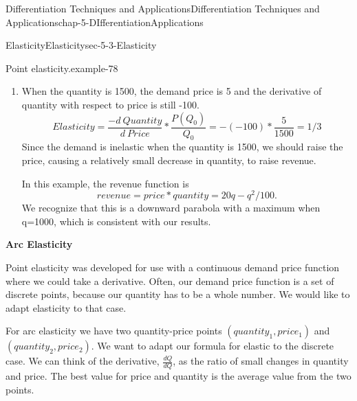 \documentclass[oneside,10pt,]{book}
\newcommand{\terminology}[1]{\textbf{#1}}
\numberwithin{equation}{section}
\begin{document}
\begin{chapterptx}{Differentiation Techniques and Applications}{}{Differentiation Techniques and Applications}{}{}{chap-5-DIfferentiationApplications}
\begin{sectionptx}{Elasticity}{}{Elasticity}{}{}{sec-5-3-Elasticity}
\begin{example}{Point elasticity.}{example-78}
\begin{enumerate}[label=(\Alph*)]
To find \(\frac{d Q}{d P}\), I recall from related rates, that \(\frac{d Q}{d P}=1/\frac{d P}{d Q}\).%
%
\begin{equation*}
\frac{d Q}{d P}=1/\left(\frac{d P}{d Q}\right)=1/\left(\frac{-1}{100}\right)=-100
\end{equation*}
\hypertarget{p-2042}{}%
Thus%
%
\begin{equation*}
Elasticity= \frac{-d Q}{d P}*\frac{P(Q_0 )}{Q_0} 
=-(-100)*\frac{12}{800}=1.5
\end{equation*}
\hypertarget{p-2043}{}%
Since the demand is elastic when the quantity is 800, we should lower the price, causing a relatively large increase in quantity, to raise revenue.%
\item\hypertarget{li-574}{}\hypertarget{p-2044}{}%
When the quantity is 1500, the demand price is 5 and the derivative of quantity with respect to price is still -100.%
%
\begin{equation*}
Elasticity=\frac{-d\ Quantity}{d\ Price}*\frac{P(Q_0)}{Q_0} =-(-100)*\frac{5}{1500}=1/3
\end{equation*}
\hypertarget{p-2045}{}%
Since the demand is inelastic when the quantity is 1500, we should raise the price, causing a relatively small decrease in quantity, to raise revenue.%
\par
\hypertarget{p-2046}{}%
In this example, the revenue function is%
%
\begin{equation*}
revenue=price*quantity=20 q-q^2/100.
\end{equation*}
\hypertarget{p-2047}{}%
We recognize that this is a downward parabola with a maximum when q=1000, which is consistent with our results.%
\end{enumerate}
\end{example}
\hypertarget{p-2048}{}%
\terminology{Arc Elasticity}%
\par
\hypertarget{p-2049}{}%
Point elasticity was developed for use with a continuous demand price function where we could take a derivative.  Often, our demand price function is a set of discrete points, because our quantity has to be a whole number.  We would like to adapt elasticity to that case.%
\par
\hypertarget{p-2050}{}%
For arc elasticity we have two quantity-price points \((quantity_1,price_1)\) and \((quantity_2,price_2)\).  We want to adapt our formula for elastic to the discrete case.  We can think of the derivative,  \(\frac{d Q}{d Q}\), as the ratio of small changes in quantity and price.  The best value for price and quantity is the average value from the two points.%

\end{sectionptx}
\end{chapterptx}
\end{document}
